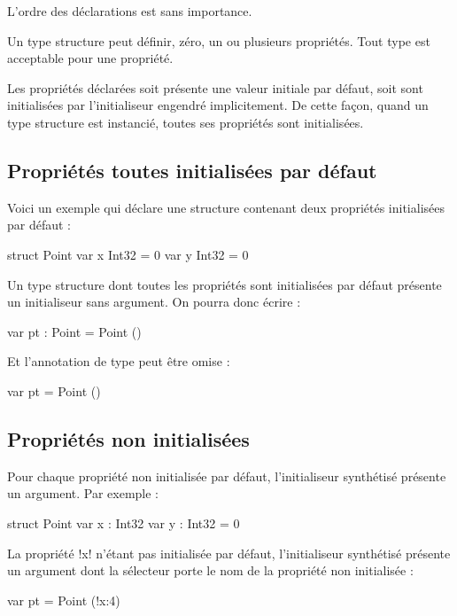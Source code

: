 L'ordre des déclarations est sans importance.











Un type structure peut définir, zéro, un ou plusieurs propriétés. Tout type est acceptable pour une propriété. 

Les propriétés déclarées soit présente une valeur initiale par défaut, soit sont initialisées par l'initialiseur engendré implicitement. De cette façon, quand un type structure est instancié, toutes ses propriétés sont initialisées. 

\subsection{Propriétés toutes initialisées par défaut}

Voici un exemple qui déclare une structure contenant deux propriétés initialisées par défaut :

\begin{PLM}
struct Point {
  var x Int32 = 0
  var y Int32 = 0
}
\end{PLM}

Un type structure dont toutes les propriétés sont initialisées par défaut présente un initialiseur sans argument. On pourra donc écrire :
\begin{PLM}
var pt : Point = Point ()
\end{PLM}

Et l'annotation de type peut être omise :
\begin{PLM}
var pt = Point ()
\end{PLM}

\subsection{Propriétés non initialisées}

Pour chaque propriété non initialisée par défaut, l'initialiseur synthétisé présente un argument. Par exemple :

\begin{PLM}
struct Point {
  var x : Int32
  var y : Int32 = 0
}
\end{PLM}

La propriété \plm!x! n'étant pas initialisée par défaut, l'initialiseur synthétisé présente un argument dont la sélecteur porte le nom de la propriété non initialisée :
\begin{PLM}
var pt = Point (!x:4)
\end{PLM}

